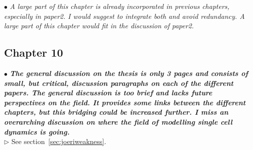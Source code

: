 \documentclass[10pt]{article}
\newcommand{\exam}[2][\  ]{\hspace{0pt}\marginpar{\color{myred}#1}$\bullet$ \textit{#2}}
\newcommand{\imp}[1]{\textbf{#1}}
\newcommand{\answ}[1]{{\color{myblue} $\triangleright$ #1}}
\newcommand{\bigexclaim}{\raisebox{-0.1em}{\BigTriangleUp}\hspace{-0.32em}\llap{\small\textbf{!}}\hspace{0.32em}}
\newcommand{\tagimp}{\bigexclaim}
\newcommand{\tagtime}{{\Large $\hourglass$}}
\begin{document}
\exam{A large part of this chapter is already incorporated in previous chapters, especially in paper2.
	I would suggest to integrate both and avoid redundancy. A large part of this chapter would fit
	in the discussion of paper2.}

 
\subsection{Chapter 10}
\exam[\tagimp \tagtime]{\imp{The general discussion on the thesis is only 3 pages and consists of small, but critical, discussion
		paragraphs on each of the different papers. The general discussion is too brief and lacks future perspectives on the field. It provides some links between the different chapters,
		but this bridging could be increased further.
		I miss an overarching discussion on where the field of modelling single cell dynamics is going.}} \\
\answ{See section~\ref{sec:joeriweakness}.}
\end{document}
